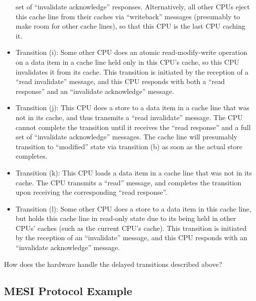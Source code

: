 \begin{itemize}
	set of ``invalidate acknowledge'' responses.
	Alternatively, all other CPUs eject this cache line from
	their caches via ``writeback'' messages (presumably to make room
	for other cache lines),
	so that this CPU is the last CPU caching it.
\item	Transition (i):
	Some other CPU does an atomic read-modify-write operation on
	a data item in a cache line held only in this CPU's cache,
	so this CPU invalidates it from its cache.
	This transition is initiated by the reception of a ``read invalidate''
	message, and this CPU responds with both a ``read response''
	and an ``invalidate acknowledge'' message.
\item	Transition (j):
	This CPU does a store to a data item in a cache line that was not
	in its cache, and thus transmits a ``read invalidate'' message.
	The CPU cannot complete the transition until it receives the
	``read response'' and a full set of ``invalidate acknowledge''
	messages.
	The cache line will presumably transition to ``modified'' state via
	transition (b) as soon as the actual store completes.
\item	Transition (k):
	This CPU loads a data item in a cache line that was not
	in its cache.
	The CPU transmits a ``read'' message, and completes the
	transition upon receiving the corresponding ``read response''.
\item	Transition (l):
	Some other CPU does a store to
	a data item in this cache line, but holds this cache line in read-only
	state due to its being held in other CPUs' caches (such as the
	current CPU's cache).
	This transition is initiated by the reception of an ``invalidate''
	message, and this CPU responds with
	an ``invalidate acknowledge'' message.
\end{itemize}

\QuickQuiz{}
	How does the hardware handle the delayed transitions
	described above?
 \QuickQuizEnd

\subsection{MESI Protocol Example}
\label{sec:app:whymb:MESI Protocol Example}

